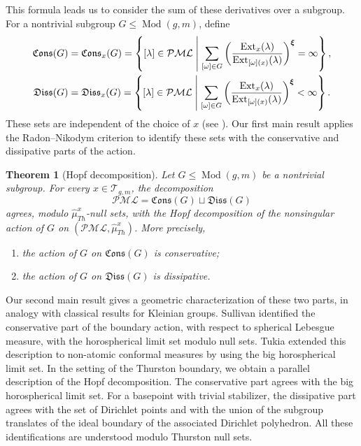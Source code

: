 \documentclass[dvipdfmx]{amsart}
\newtheorem{theorem}{Theorem}[section]
\theoremstyle{remark}
\newcommand{\ext}{{\rm Ext}}
\newcommand{\teich}{\mathcal{T}}
\newcommand{\tmod}{\operatorname{Mod}}
\newcommand{\PThursM}{\hat{\mu}_{Th}}
\newcommand{\convgenus}{{\boldsymbol \xi}}
\newcommand{\pml}{\mathcal{PML}}
\newcommand{\conservativepart}{\mathfrak{Cons}}
\newcommand{\dissipativepart}{\mathfrak{Diss}}
\begin{document}
This formula leads us to consider the sum of these derivatives over
a subgroup. For a nontrivial subgroup $G\le\tmod(g,m)$, define
\begin{align*}
\conservativepart(G)
&=\conservativepart_x(G)
=\left\{[\lambda]\in\pml\mathrel{}\middle|\mathrel{}
\sum_{[\omega]\in G}
\left(
\frac{\ext_x(\lambda)}
{\ext_{[\omega](x)}(\lambda)}
\right)^{\convgenus}
=\infty
\right\},\\
\dissipativepart(G)
&=\dissipativepart_x(G)
=\left\{[\lambda]\in\pml\mathrel{}\middle|\mathrel{}
\sum_{[\omega]\in G}
\left(
\frac{\ext_x(\lambda)}
{\ext_{[\omega](x)}(\lambda)}
\right)^{\convgenus}
<\infty
\right\}.
\end{align*}
These sets are independent of the choice of $x$
(see ).
Our first main result applies the Radon--Nikodym criterion to identify
these sets with the conservative and dissipative parts of the action.

\begin{theorem}[Hopf decomposition]
\label{thm:Hopf_decomposition_main}
Let $G\le\tmod(g,m)$ be a nontrivial subgroup.
For every $x\in\teich_{g,m}$, the decomposition
\[
\pml=\conservativepart(G)\sqcup\dissipativepart(G)
\]
agrees, modulo $\PThursM^x$-null sets, with the Hopf decomposition
of the nonsingular action of $G$ on $(\pml,\PThursM^x)$.
More precisely,
\begin{enumerate}
\item the action of $G$ on $\conservativepart(G)$ is conservative;
\item the action of $G$ on $\dissipativepart(G)$ is dissipative.
\end{enumerate}
\end{theorem}

Our second main result gives a geometric characterization of these
two parts, in analogy with classical results for Kleinian groups.
Sullivan \cite{Sullivan1981} identified the conservative part of the boundary action, with respect to spherical Lebesgue measure, with the horospherical limit set modulo null sets.
Tukia \cite[Theorem~1]{Tukia1997} extended this description to non-atomic conformal measures by using the big horospherical limit set.
In the setting of the Thurston boundary, we obtain a parallel
description of the Hopf decomposition. The conservative part
agrees with the big horospherical limit set. For a basepoint
with trivial stabilizer, the dissipative part agrees with
the set of Dirichlet points and with the union of the
subgroup translates of the ideal boundary of the associated
Dirichlet polyhedron. All these identifications are
understood modulo Thurston null sets.
\end{document}
